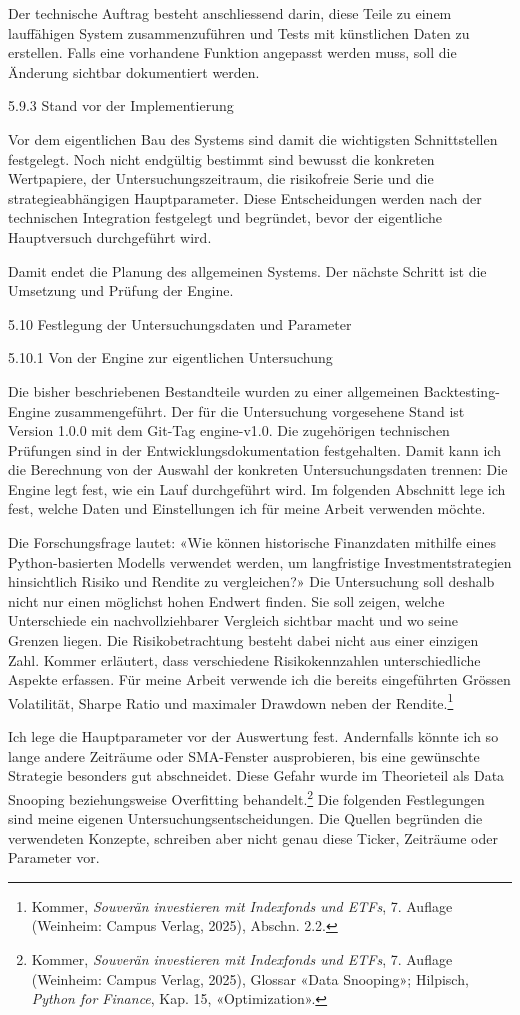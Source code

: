 \documentclass[
  ngerman,
  a4paper,
  DIV=11,
  oneside]{scrreprt}
\begin{document}
Der technische Auftrag besteht anschliessend darin, diese Teile zu einem
lauffähigen System zusammenzuführen und Tests mit künstlichen Daten zu
erstellen. Falls eine vorhandene Funktion angepasst werden muss, soll
die Änderung sichtbar dokumentiert werden.

5.9.3 Stand vor der Implementierung

Vor dem eigentlichen Bau des Systems sind damit die wichtigsten
Schnittstellen festgelegt. Noch nicht endgültig bestimmt sind bewusst
die konkreten Wertpapiere, der Untersuchungszeitraum, die risikofreie
Serie und die strategieabhängigen Hauptparameter. Diese Entscheidungen
werden nach der technischen Integration festgelegt und begründet, bevor
der eigentliche Hauptversuch durchgeführt wird.

Damit endet die Planung des allgemeinen Systems. Der nächste Schritt ist
die Umsetzung und Prüfung der Engine.

5.10 Festlegung der Untersuchungsdaten und Parameter

5.10.1 Von der Engine zur eigentlichen Untersuchung

Die bisher beschriebenen Bestandteile wurden zu einer allgemeinen
Backtesting-Engine zusammengeführt. Der für die Untersuchung vorgesehene
Stand ist Version 1.0.0 mit dem Git-Tag engine-v1.0. Die zugehörigen
technischen Prüfungen sind in der Entwicklungsdokumentation
festgehalten. Damit kann ich die Berechnung von der Auswahl der
konkreten Untersuchungsdaten trennen: Die Engine legt fest, wie ein Lauf
durchgeführt wird. Im folgenden Abschnitt lege ich fest, welche Daten
und Einstellungen ich für meine Arbeit verwenden möchte.

Die Forschungsfrage lautet: «Wie können historische Finanzdaten mithilfe
eines Python-basierten Modells verwendet werden, um langfristige
Investmentstrategien hinsichtlich Risiko und Rendite zu vergleichen?»
Die Untersuchung soll deshalb nicht nur einen möglichst hohen Endwert
finden. Sie soll zeigen, welche Unterschiede ein nachvollziehbarer
Vergleich sichtbar macht und wo seine Grenzen liegen. Die
Risikobetrachtung besteht dabei nicht aus einer einzigen Zahl. Kommer
erläutert, dass verschiedene Risikokennzahlen unterschiedliche Aspekte
erfassen. Für meine Arbeit verwende ich die bereits eingeführten Grössen
Volatilität, Sharpe Ratio und maximaler Drawdown neben der
Rendite.\footnote{Kommer, \emph{Souverän investieren mit Indexfonds und
  ETFs}, 7. Auflage (Weinheim: Campus Verlag, 2025), Abschn. 2.2.}

Ich lege die Hauptparameter vor der Auswertung fest. Andernfalls könnte
ich so lange andere Zeiträume oder SMA-Fenster ausprobieren, bis eine
gewünschte Strategie besonders gut abschneidet. Diese Gefahr wurde im
Theorieteil als Data Snooping beziehungsweise Overfitting
behandelt.\footnote{Kommer, \emph{Souverän investieren mit Indexfonds
  und ETFs}, 7. Auflage (Weinheim: Campus Verlag, 2025), Glossar «Data
  Snooping»; Hilpisch, \emph{Python for Finance}, Kap. 15,
  «Optimization».} Die folgenden Festlegungen sind meine eigenen
Untersuchungsentscheidungen. Die Quellen begründen die verwendeten
Konzepte, schreiben aber nicht genau diese Ticker, Zeiträume oder
Parameter vor.
\end{document}
